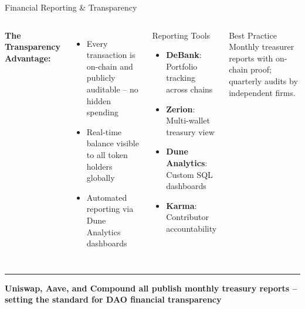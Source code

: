 \documentclass[8pt,aspectratio=169]{beamer}
\newcommand{\bottomnote}[1]{\vfill\vspace{-2mm}\textcolor{mllavender2}{\rule{\textwidth}{0.4pt}}\vspace{1mm}\footnotesize\textbf{#1}}
\begin{document}
\begin{frame}{Financial Reporting \& Transparency}
\begin{columns}[T]
\vspace{2mm}
\textbf{\textcolor{mlpurple}{The Transparency Advantage:}}\\[4pt]
\begin{itemize}\setlength\itemsep{4pt}
  \item Every transaction is on-chain and publicly auditable -- no hidden spending
  \item Real-time balance visible to all token holders globally
  \item Automated reporting via Dune Analytics dashboards
\end{itemize}
\vspace{4pt}
\begin{block}{Reporting Tools}
\begin{itemize}\setlength\itemsep{2pt}
  \item \textbf{DeBank}: Portfolio tracking across chains
  \item \textbf{Zerion}: Multi-wallet treasury view
  \item \textbf{Dune Analytics}: Custom SQL dashboards
  \item \textbf{Karma}: Contributor accountability
\end{itemize}
\end{block}
\vspace{4pt}
\begin{block}{Best Practice}
\scriptsize Monthly treasurer reports with on-chain proof; quarterly audits by independent firms.
\end{block}
\end{columns}
\bottomnote{Uniswap, Aave, and Compound all publish monthly treasury reports -- setting the standard for DAO financial transparency}
\end{frame}
\end{document}
